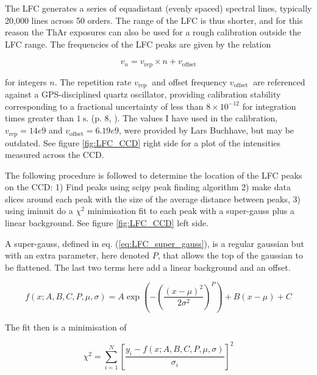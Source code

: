     The LFC generates a series of equadistant (evenly spaced) spectral lines, typically 20,000 lines across 50 orders. The range of the LFC is thus shorter, and for this reason the ThAr exposures can also be used for a rough calibration outside the LFC range. The frequencies of the LFC peaks are given by the relation
    
    \begin{equation}
        \label{eq:LFC_freq_eq}
        v_{n}=v_{\text{rep}} \times n+v_{\text{offset}}
    \end{equation}

    for integers $n$. The repetition rate $v_{\text {rep }}$ and offset frequency $v_{\text {offset }}$ are referenced against a GPS-disciplined quartz oscillator, providing calibration stability corresponding to a fractional uncertainty of less than $8 \times 10^{-12}$ for integration times greater than $1 \mathrm{~s}$. (p. 8, \cite{first_RV_from_EXPRES}). The values I have used in the calibration, $v_{\text{rep}} = 14e9$ and $v_{\text{offset}} = 6.19e9$, were provided by Lars Buchhave, but may be outdated. See figure \ref{fig:LFC_CCD} right side for a plot of the intensities measured across the CCD.

    The following procedure is followed to determine the location of the LFC peaks on the CCD: 1) Find peaks using scipy peak finding algorithm 2) make data slices around each peak with the size of the average distance between peaks, 3) using iminuit do a $\chi^2$ minimisation fit to each peak with a super-gauss plus a linear background. See figure \ref{fig:LFC_CCD} left side.

    A super-gauss, defined in eq. (\ref{eq:LFC_super_gauss}), is a regular gaussian but with an extra parameter, here denoted $P$, that allows the top of the gaussian to be flattened. The last two terms here add a linear background and an offset. 
    
    \begin{equation}
        \label{eq:LFC_super_gauss}
        f(x ; A, B, C, P, \mu, \sigma) = A \exp \left(-\left(\frac{\left(x-\mu\right)^{2}}{2 \sigma^{2}}\right)^{P}\right) + B(x-\mu) + C
    \end{equation}

    The fit then is a minimisation of  

    \begin{equation}
        \label{eq:chi2_super_gauss}
        \chi^{2}=\sum_{i=1}^{N}\left[\frac{y_{i}-f(x ; A, B, C, P, \mu, \sigma)}{\sigma_{i}}\right]^{2}
    \end{equation}

